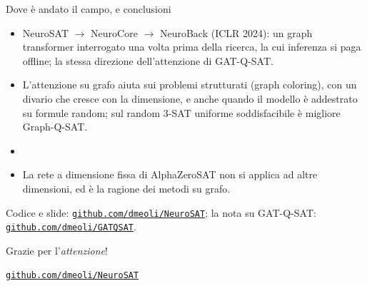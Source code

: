 \documentclass[aspectratio=169]{beamer}
\newcommand{\T}[2]{#2}
\newcommand{\T}[2]{#1}
\newcommand{\upd}[1]{#1}
\begin{document}
\begin{frame}{\T{Where the field went, and conclusions}{Dove \`e andato il campo, e conclusioni}}
  \small
  \begin{itemize}
    \item \T{NeuroSAT $\to$ NeuroCore $\to$ NeuroBack (ICLR 2024): a graph transformer queried
          once before the search, whose inference is paid offline; the same direction of
          attention as GAT-Q-SAT.}%
          {NeuroSAT $\to$ NeuroCore $\to$ NeuroBack (ICLR 2024): un graph transformer
          interrogato una volta prima della ricerca, la cui inferenza si paga offline; la stessa
          direzione dell'attenzione di GAT-Q-SAT.}
    \item \T{Graph attention helps on structured problems (graph coloring), with a gap that
          grows with the size, and also when the model is trained on random formulas; on
          satisfiable uniform random 3-SAT Graph-Q-SAT is better.}%
          {L'attenzione su grafo aiuta sui problemi strutturati (graph coloring), con un
          divario che cresce con la dimensione, e anche quando il modello \`e addestrato su
          formule random; sul random 3-SAT uniforme soddisfacibile \`e migliore Graph-Q-SAT.}
    \item \upd{\T{[The controls and the transfer panel, from the note.]}{[I controlli e il
          pannello di transfer, dalla nota.]}}
    \item \T{The fixed-size network of AlphaZeroSAT cannot be applied to other sizes, which is
          the motivation of the graph methods.}%
          {La rete a dimensione fissa di AlphaZeroSAT non si applica ad altre dimensioni, ed \`e
          la ragione dei metodi su grafo.}
  \end{itemize}
  \vspace{4mm}
  {\scriptsize \T{Code and slides:}{Codice e slide:}
  \href{https://github.com/dmeoli/NeuroSAT}{\texttt{github.com/dmeoli/NeuroSAT}};
  \T{the note on GAT-Q-SAT:}{la nota su GAT-Q-SAT:}
  \href{https://github.com/dmeoli/GATQSAT}{\texttt{github.com/dmeoli/GATQSAT}}.}
\end{frame}

\begin{frame}[standout]
  \T{Thank you for your \emph{attention}!}{Grazie per l'\emph{attenzione}!}
  \par{}
  {\mdseries
   \href{https://github.com/dmeoli/NeuroSAT}{\textcolor{lamalunga-on-primary}{\texttt{github.com/dmeoli/NeuroSAT}}}}
\end{frame}
\end{document}

